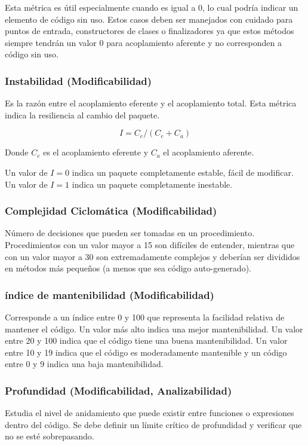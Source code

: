 Esta métrica es útil especialmente cuando es igual a $0$, lo cual podría indicar un elemento de código sin 
uso. Estos casos deben ser manejados con cuidado para puntos de entrada, constructores de clases o 
finalizadores ya que estos métodos siempre tendrán un valor $0$ para acoplamiento aferente y no 
corresponden a código sin uso.

\subsubsection{Instabilidad (Modificabilidad)}

Es la razón entre el acoplamiento eferente y el acoplamiento total. Esta métrica indica la resiliencia 
al cambio del paquete.

\begin{equation*}
I = C_e / (C_e + C_a)
\end{equation*}

Donde $C_e$ es el acoplamiento eferente y $C_a$ el acoplamiento aferente.

Un valor de $I=0$ indica un paquete completamente estable, fácil de modificar. Un valor de $I=1$ indica
un paquete completamente inestable.

\subsubsection{Complejidad Ciclomática (Modificabilidad)}
Número de decisiones que pueden ser tomadas en un procedimiento.
Procedimientos con un valor mayor a 15 son difíciles de entender, mientras que con un valor mayor a 30
son extremadamente complejos y deberían ser divididos en métodos más pequeños (a menos que sea código 
auto-generado).

\subsubsection{índice de mantenibilidad (Modificabilidad)}

Corresponde a un índice entre 0 y 100 que representa la facilidad relativa
de mantener el código. Un valor más alto indica una mejor mantenibilidad. Un valor entre 20 y 100
indica que el código tiene una buena mantenibilidad. Un valor entre 10 y 19 indica que el código es
moderadamente mantenible y un código entre 0 y 9 indica una baja mantenibilidad.

\subsubsection{Profundidad (Modificabilidad, Analizabilidad)}
Estudia el nivel de anidamiento que puede existir entre funciones o expresiones dentro del código.
Se debe definir un límite crítico de profundidad y verificar que no se esté sobrepasando.

